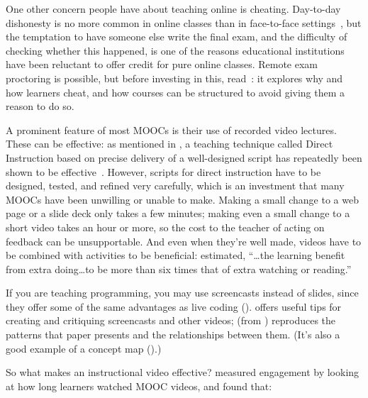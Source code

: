 One other concern people have about teaching online is cheating.
Day-to-day dishonesty is no more common in online classes than in face-to-face settings~\cite{Beck2014},
but the temptation to have someone else write the final exam,
and the difficulty of checking whether this happened,
is one of the reasons educational institutions have been reluctant to offer credit for pure online classes.
Remote exam proctoring is possible,
but before investing in this,
read~\cite{Lang2013}:
it explores why and how learners cheat,
and how courses can be structured to avoid giving them a reason to do so.


A prominent feature of most MOOCs is their use of recorded video lectures.
These can be effective:
as mentioned in ,
a teaching technique called Direct Instruction
based on precise delivery of a well-designed script has repeatedly been shown to be effective~\cite{Stoc2018}.
However,
scripts for direct instruction have to be designed,
tested,
and refined very carefully,
which is an investment that many MOOCs have been unwilling or unable to make.
Making a small change to a web page or a slide deck only takes a few minutes;
making even a small change to a short video takes an hour or more,
so the cost to the teacher of acting on feedback can be unsupportable.
And even when they're well made,
videos have to be combined with activities to be beneficial:
\cite{Koed2015} estimated,
``{\ldots}the learning benefit from extra doing{\ldots}to be
more than six times that of extra watching or reading.''

If you are teaching programming,
you may use screencasts instead of slides,
since they offer some of the same advantages as live coding ().
\cite{Chen2009} offers useful tips for creating and critiquing screencasts and other videos;
 (from \cite{Chen2009}) reproduces the patterns that paper presents
and the relationships between them.
(It's also a good example of a concept map ().)


So what makes an instructional video effective?
\cite{Guo2014} measured engagement by looking at how long learners watched MOOC videos,
and found that:

